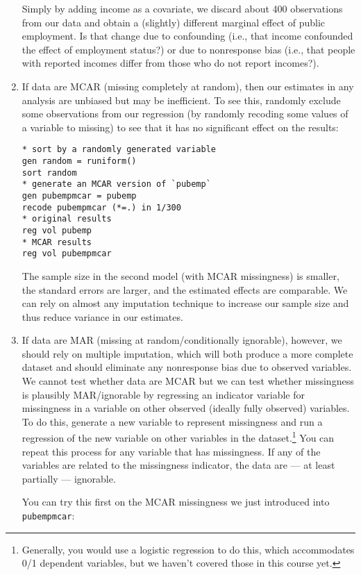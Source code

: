 \documentclass[a4paper,12pt]{article}
\begin{document}
\begin{enumerate}
Simply by adding income as a covariate, we discard about 400 observations from our data and obtain a (slightly) different marginal effect of public employment. Is that change due to confounding (i.e., that income confounded the effect of employment status?) or due to nonresponse bias (i.e., that people with reported incomes differ from those who do not report incomes?).

\item If data are MCAR (missing completely at random), then our estimates in any analysis are unbiased but may be inefficient. To see this, randomly exclude some observations from our regression (by randomly recoding some values of a variable to missing) to see that it has no significant effect on the results:

\begin{verbatim}
* sort by a randomly generated variable
gen random = runiform()
sort random
* generate an MCAR version of `pubemp`
gen pubempmcar = pubemp
recode pubempmcar (*=.) in 1/300
* original results
reg vol pubemp
* MCAR results
reg vol pubempmcar
\end{verbatim}

The sample size in the second model (with MCAR missingness) is smaller, the standard errors are larger, and the estimated effects are comparable. We can rely on almost any imputation technique to increase our sample size and thus reduce variance in our estimates.

\item If data are MAR (missing at random/conditionally ignorable), however, we should rely on multiple imputation, which will both produce a more complete dataset and should eliminate any nonresponse bias due to observed variables. We cannot test whether data are MCAR but we can test whether missingness is plausibly MAR/ignorable by regressing an indicator variable for missingness in a variable on other observed (ideally fully observed) variables. To do this, generate a new variable to represent missingness and run a regression of the new variable on other variables in the dataset.\footnote{Generally, you would use a logistic regression to do this, which accommodates 0/1 dependent variables, but we haven't covered those in this course yet.} You can repeat this process for any variable that has missingness. If any of the variables are related to the missingness indicator, the data are --- at least partially --- ignorable.

You can try this first on the MCAR missingness we just introduced into \texttt{pubempmcar}:


\end{enumerate}
\end{document}
